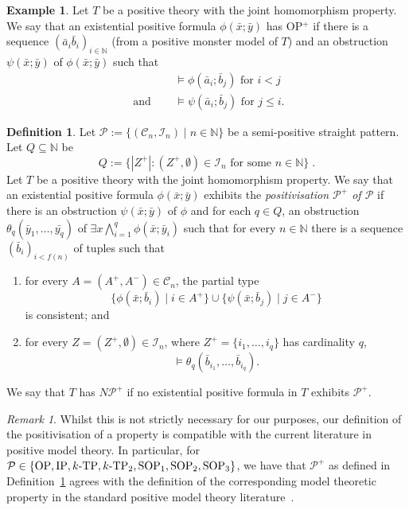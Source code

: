 \documentclass{amsart}
\theoremstyle{definition}
\newtheorem{definition}[theorem]{Definition}
\newtheorem{example}[theorem]{Example}
\theoremstyle{remark}
\newtheorem{remark}[theorem]{Remark}
\numberwithin{equation}{section}
\begin{document}
\begin{example} Let $T$ be a positive theory with the joint homomorphism property. We say that an existential positive formula $\phi(\bar{x};\bar{y})$ has OP$^+$ if there is a sequence $(\bar{a}_i\bar{b}_i)_{i\in\mathbb{N}}$ (from a positive monster model of $T$) and an obstruction $\psi(\bar{x};\bar{y})$ of $\phi(\bar{x};\bar{y})$ such that 
\begin{align*} & \vDash \phi(\bar{a}_i; \bar{b}_j)  \text{ for } i< j \\
\text{ and } \quad & \vDash \psi(\bar{a}_i; \bar{b}_j)  \text{ for } j\leq i.
\end{align*}
\end{example}


\begin{definition}\label{def:positivisation}
    Let $\mathcal{P}:=\{(\mathcal{C}_n, \mathcal{I}_n) \mid n\in\mathbb{N}\}$ be a semi-positive straight pattern. Let  $Q\subseteq \mathbb{N}$ be 
    \[Q:=\{|Z^+| : (Z^+, \emptyset)\in\mathcal{I}_n \text{ for some }n\in\mathbb{N}\}\;.\]
    Let $T$ be a positive theory with the joint homomorphism property. We say that an existential positive formula $\phi(\bar{x};\bar{y})$ exhibits the \emph{positivisation $\mathcal{P}^+$ of $\mathcal{P}$} if there is an obstruction $\psi(\bar{x};\bar{y})$ of $\phi$ and for each $q\in Q$, an obstruction $\theta_{q}(\bar{y}_1, \dots, \bar{y_q})$ of $\exists x\bigwedge_{i=1}^q\phi(\bar{x}; \bar{y}_i)$ such that for every $n\in\mathbb{N}$ there is a sequence $(\bar{b}_i)_{i<f(n)}$ of {tuples} such that
\begin{enumerate}
    \item for every $A=(A^+, A^-)\in\mathcal{C}_n$, the partial type
    \[\{\phi(\bar{x};\bar{b}_i)\mid i\in A^+\}\cup\{\psi(\bar{x};\bar{b}_j)\mid j\in A^-\}\]
    is consistent; and
    \item for every $Z=(Z^+, \emptyset)\in\mathcal{I}_n$,
    where $Z^+=\{i_1, \dots, i_q\}$ has cardinality $q$,
    \[\vDash\theta_{q}(\bar{b}_{i_1}, \dots, \bar{b}_{i_q}).\]
\end{enumerate}
    We say that $T$ has $N\mathcal{P}^+$ if no existential positive formula in $T$ exhibits $\mathcal{P}^+$.
 \end{definition}

 \begin{remark} Whilst this is not strictly necessary for our purposes, our definition of the positivisation of a property is compatible with the current literature in positive model theory. In particular, for $\mathcal{P}\in\{\mathrm{OP}, \mathrm{IP}, k\textnormal{-}\mathrm{TP}, k\textnormal{-}\mathrm{TP}_2, \mathrm{SOP}_1, \mathrm{SOP}_2, \mathrm{SOP}_3\}$, we have that $\mathcal{P}^+$ as defined in Definition~\ref{def:positivisation} agrees with the definition of the corresponding model theoretic property in the standard positive model theory literature~\cite{PosModT}.
 \end{remark}
\end{document}
